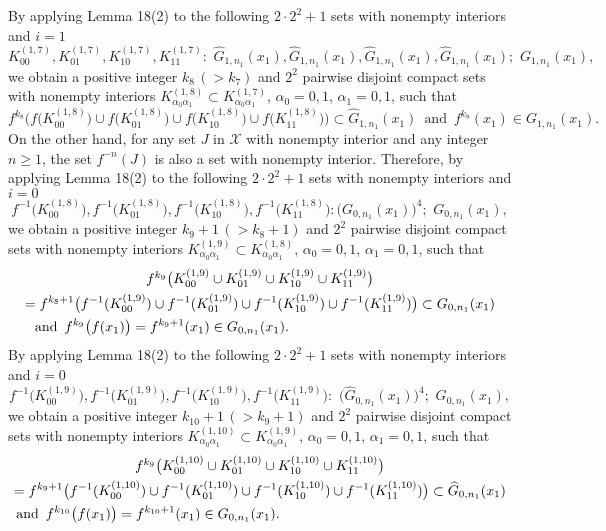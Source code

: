 \documentclass[12pt]{article}
\newcommand{\al}{\alpha}
\begin{document}
\indent By applying Lemma 18(2) to the following $2 \cdot 2^2+1$ sets with nonempty interiors and $i = 1$
$$
K_{00}^{(1,7)}, K_{01}^{(1,7)}, K_{10}^{(1,7)}, K_{11}^{(1,7)}: \,\, \widehat G_{1,n_1}(x_1), \widehat G_{1,n_1}(x_1), \widehat G_{1,n_1}(x_1), \widehat G_{1,n_1}(x_1); \,\, G_{1,n_1}(x_1),
$$
we obtain a positive integer $k_8 \, (> k_7)$ and $2^2$ pairwise disjoint compact sets with nonempty interiors $K_{\al_0\al_1}^{(1,8)} \subset K_{\al_0\al_1}^{(1,7)}$, $\al_0 = 0, 1$, $\al_1 = 0, 1$, such that 
$$
f^{k_8}\bigg(f\big(K_{00}^{(1,8)}\big) \cup f\big(K_{01}^{(1,8)}\big) \cup f\big(K_{10}^{(1,8)}\big) \cup f\big(K_{11}^{(1,8)}\big)\bigg) \subset \widehat G_{1,n_1}(x_1) \,\,\, \text{and} \,\,\, f^{k_8}(x_1) \in G_{1,n_1}(x_1).
$$
\indent On the other hand, for any set $J$ in $\mathcal X$ with nonempty interior and any integer $n \ge 1$, the set $f^{-n}(J)$ is also a set with nonempty interior.  Therefore, by applying Lemma 18(2) to the following $2 \cdot 2^2+1$ sets with nonempty interiors and $i = 0$ 
$$
f^{-1}\big(K_{00}^{(1,8)}\big), f^{-1}\big(K_{01}^{(1,8)}\big), f^{-1}\big(K_{10}^{(1,8)}\big), f^{-1}\big(K_{11}^{(1,8)}\big): \big(G_{0,n_1}(x_1)\big)^4; \,\, G_{0,n_1}(x_1),
$$
we obtain a positive integer $k_9+1 \, (> k_8+1)$ and $2^2$ pairwise disjoint compact sets with nonempty interiors $K_{\al_0\al_1}^{(1,9)} \subset K_{\al_0\al_1}^{(1,8)}$, $\al_0 = 0, 1$, $\al_1 = 0, 1$, such that 
\begin{multline*}
$$
f^{k_9}\big(K_{00}^{(1,9)} \cup K_{01}^{(1,9)} \cup K_{10}^{(1,9)} \cup K_{11}^{(1,9)}\big) \\
= f^{k_8+1}\big(f^{-1}(K_{00}^{(1,9)}) \cup f^{-1}(K_{01}^{(1,9)}) \cup f^{-1}(K_{10}^{(1,9)}) \cup f^{-1}(K_{11}^{(1,9)})\big) \subset G_{0,n_1}(x_1) \\ 
\text{and} \,\,\, f^{k_9}\big(f(x_1)\big) = f^{k_9+1}(x_1) \in G_{0,n_1}(x_1).\qquad\qquad\qquad\qquad\qquad\qquad\qquad
$$
\end{multline*}
\indent By applying Lemma 18(2) to the following $2 \cdot 2^2+1$ sets with nonempty interiors and $i = 0$
$$
f^{-1}\big(K_{00}^{(1,9)}\big), f^{-1}\big(K_{01}^{(1,9)}\big), f^{-1}\big(K_{10}^{(1,9)}\big), f^{-1}\big(K_{11}^{(1,9)}\big): \,\, \big(\widehat G_{0,n_1}(x_1)\big)^4; \,\, G_{0,n_1}(x_1),
$$
we obtain a positive integer $k_{10}+1 \, (> k_9+1)$ and $2^2$ pairwise disjoint compact sets with nonempty interiors $K_{\al_0\al_1}^{(1,10)} \subset K_{\al_0\al_1}^{(1,9)}$, $\al_0 = 0, 1$, $\al_1 = 0, 1$, such that 
\begin{multline*}
$$
f^{k_9}\big(K_{00}^{(1,10)} \cup K_{01}^{(1,10)} \cup K_{10}^{(1,10)} \cup K_{11}^{(1,10)}\big) \\
= f^{k_9+1}\big(f^{-1}(K_{00}^{(1,10)}) \cup f^{-1}(K_{01}^{(1,10)}) \cup f^{-1}(K_{10}^{(1,10)}) \cup f^{-1}(K_{11}^{(1,10)})\big) \subset \widehat G_{0,n_1}(x_1) \\ 
\text{and} \,\,\, f^{k_{10}}\big(f(x_1)\big) = f^{k_{10}+1}(x_1) \in G_{0,n_1}(x_1).\qquad\qquad\qquad\qquad\qquad\qquad\qquad\qquad%
$$
\end{multline*}
\end{document}
